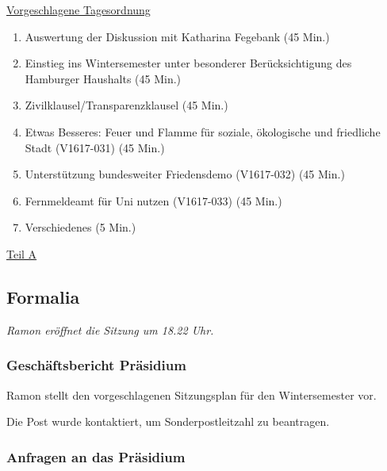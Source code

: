 \documentclass[ngerman,headheight=70pt]{scrartcl}
\begin{document}
    \newpage
    \underline{Vorgeschlagene Tagesordnung}
    \begin{enumerate}[label={\textbf{Top \theenumi}},leftmargin=*]
        \item Auswertung der Diskussion mit Katharina Fegebank  (45 Min.)
        \item Einstieg ins Wintersemester unter besonderer Berücksichtigung des Hamburger Haushalts (45 Min.)
        \item Zivilklausel/Transparenzklausel (45 Min.)
        \item Etwas Besseres: Feuer und Flamme für soziale, ökologische und friedliche Stadt (V1617-031) (45 Min.)
        \item Unterstützung bundesweiter Friedensdemo (V1617-032) (45 Min.)
        \item Fernmeldeamt für Uni nutzen (V1617-033) (45 Min.)
        \item Verschiedenes (5 Min.)
    \end{enumerate}

    \newpage


    {\Large \underline{Teil A}}

    \subsection{Formalia}

    \textit{Ramon eröffnet die Sitzung um 18.22 Uhr.}

    \subsubsection{Geschäftsbericht Präsidium}

    Ramon stellt den vorgeschlagenen Sitzungsplan für den Wintersemester
    vor.

    Die Post wurde kontaktiert, um Sonderpostleitzahl zu beantragen.

    \subsubsection{Anfragen an das Präsidium}
\end{document}
